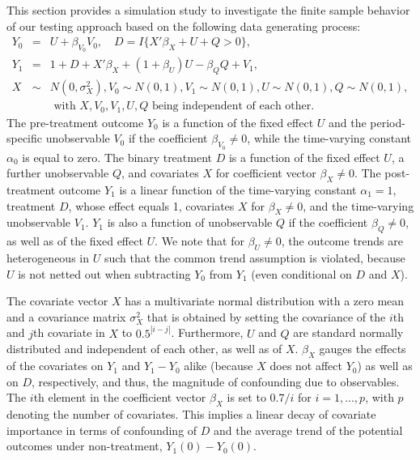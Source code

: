 {	This section provides a simulation study to investigate the finite sample behavior of our testing approach based on the following data generating process:
	\begin{eqnarray*}
		Y_0 &=& U + \beta_{V_0}V_0,\quad D = I\{X'\beta_{X} + U  + Q >0\},\\
		Y_1 &=& 1 + D + X'\beta_{X}  + (1+\beta_U) U - \beta_Q Q+V_1, \\
		X &\sim& N(0,\sigma^2_X), V_0\sim N(0,1),  V_1\sim N(0,1), U\sim N(0,1),  Q\sim N(0,1), \\ 
		&&\textrm{ with }X,V_0,V_1,U,Q\textrm{ being independent of each other}.
	\end{eqnarray*}
	The pre-treatment outcome $Y_0$ is a function of the fixed effect $U$ and the period-specific unobservable $V_0$ if the coefficient $\beta_{V_0} \neq 0$, while the time-varying constant $\alpha_0$ is equal to zero. The binary treatment $D$ is a function of the fixed effect $U$, a further unobservable $Q$, and covariates $X$ for coefficient vector $\beta_X \neq 0$. The post-treatment outcome $Y_1$ is a linear function of the time-varying  constant $\alpha_1=1$, treatment $D$, whose effect equals 1, covariates $X$ for $\beta_X \neq 0$, and the time-varying unobservable $V_1$. $Y_1$ is also a function of unobservable $Q$ if the coefficient $\beta_Q \neq 0$, as well as of the fixed effect $U$. We note that for $\beta_U\neq 0$, the outcome trends are heterogeneous in $U$ such that the common trend assumption is violated, because $U$ is not netted out when subtracting $Y_0$ from $Y_1$ (even conditional on $D$ and $X$).
	
	The covariate vector $X$ has a multivariate normal distribution with a zero mean and a covariance matrix $\sigma^2_X$ that is obtained by setting the covariance of the $i$th and $j$th covariate in $X$  to $0.5^{|i-j|}$. Furthermore, $U$ and $Q$ are standard normally distributed and independent of each other, as well as of $X$. $\beta_X$ gauges the effects of the covariates on $Y_1$ and $Y_1-Y_0$ alike (because $X$ does not affect $Y_0$) as well as on $D$, respectively, and thus, the magnitude of confounding due to observables. The $i$th element in the coefficient vector $\beta_X$ is set to $0.7/i$ for $i=1,...,p$, with $p$ denoting the number of covariates. This implies a linear decay of covariate importance in terms of confounding of $D$ and the average trend of the potential outcomes under non-treatment, $Y_1(0)-Y_0(0)$.
	
}
